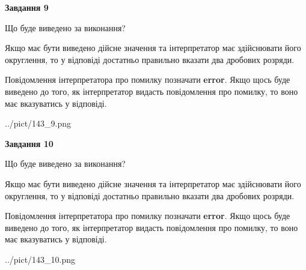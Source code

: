 \documentclass[12pt, ukrainian]{article}
\begin{document}
{\begin {Large}
{\begin {center}\textbf{Завдання 9}\end {center}}\par
Що буде виведено за виконання? \par

Якщо має бути виведено дійсне значення та інтерпретатор має здійснювати його округлення, 
то у відповіді достатньо правильно вказати два дробових розряди.

Повідомлення інтерпретатора про помилку позначати \textbf{error}.
Якщо щось буде виведено до того, як інтерпретатор видасть повідомлення про помилку, 
то воно має вказуватись у відповіді. \par

\begin{center}
	{../pict/143_9.png}
\end{center}
\newpage

{\begin {center}\textbf{Завдання 10}\end {center}}\par
Що буде виведено за виконання? \par

Якщо має бути виведено дійсне значення та інтерпретатор має здійснювати його округлення, 
то у відповіді достатньо правильно вказати два дробових розряди.

Повідомлення інтерпретатора про помилку позначати \textbf{error}.
Якщо щось буде виведено до того, як інтерпретатор видасть повідомлення про помилку, 
то воно має вказуватись у відповіді. \par

\begin{center}
	{../pict/143_10.png}
\end{center}
\newpage

\end {Large}}
\end{document}
